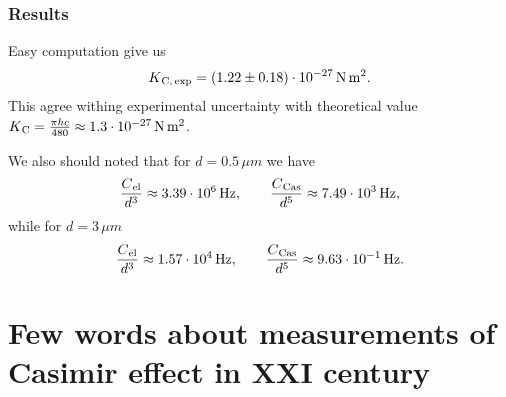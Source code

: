 \documentclass[10pt,t]{beamer}
\begin{document}
\begin{frame}
  \frametitle{Results}


  Easy computation give us
  \begin{equation}
    \label{eq:Zarys-badan-ETC-14}
    K_{ \HorSpaceTwo \text{C}, \, \text{exp} } =
    ( 1.22 \pm 0.18 ) \cdot 10^{ -27 } \, \si{N.m}^{ 2 }.
  \end{equation}
  This agree withing experimental uncertainty with theoretical
  value $K_{ \HorSpaceTwo \text{C} } = \frac{ \pi h c }{ 480 } \approx
  1.3 \cdot 10^{ -27 } \, \si{N.m^{ 2 }}$.

  We also should noted that for $d = 0.5 \, \mu\si{m}$ we have
  \begin{equation}
    \label{eq:Herdegens-approach-01}
    \frac{ C_{ \HorSpaceTwo \text{el} } }{ d^{ 3 } } \approx
    3.39 \cdot 10^{ 6 } \, \si{Hz}, \qquad
    \frac{ C_{ \HorSpaceTwo \text{Cas} } }{ d^{ 5 } } \approx
    7.49 \cdot 10^{ 3 } \, \si{Hz},
  \end{equation}
  while for $d = 3 \, \mu\si{m}$
  \begin{equation}
    \label{eq:Herdegens-approach-01}
    \frac{ C_{ \HorSpaceTwo \text{el} } }{ d^{ 3 } } \approx
    1.57 \cdot 10^{ 4 } \, \si{Hz}, \qquad
    \frac{ C_{ \HorSpaceTwo \text{Cas} } }{ d^{ 5 } } \approx
    9.63 \cdot 10^{ -1 } \, \si{Hz}.
  \end{equation}

\end{frame}















\section{Few words about measurements of Casimir effect in
  XXI century}
\end{document}
